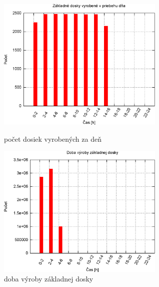 \documentclass[12pt,a4paper,titlepage,final]{article}
\begin{document}
\begin{figure}[!ht]
  \centering
  \begin{minipage}{0.45\linewidth}
  \centering
  \includegraphics[width=8cm]{doc/1_hist1.eps}
  \caption{počet dosiek vyrobených za deň}
  \end{minipage}
  \quad
  \begin{minipage}{0.45\linewidth}
    \centering
    \includegraphics[width=8cm]{doc/1_hist2.eps}
    \caption{doba výroby základnej dosky}
  \end{minipage}
\end{figure}
\end{document}
